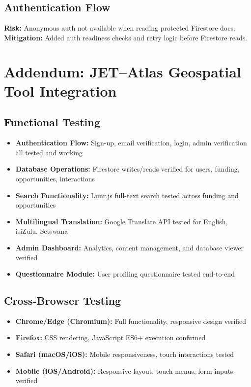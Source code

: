 \documentclass[a4paper,12pt]{article}
\begin{document}
\subsection{Authentication Flow}
\textbf{Risk:} Anonymous auth not available when reading protected Firestore docs.
\textbf{Mitigation:} Added auth readiness checks and retry logic before Firestore reads.

\section{Addendum: JET–Atlas Geospatial Tool Integration}


\subsection{Functional Testing}
\begin{itemize}
    \item \textbf{Authentication Flow:} Sign-up, email verification, login, admin verification all tested and working
    \item \textbf{Database Operations:} Firestore writes/reads verified for users, funding, opportunities, interactions
    \item \textbf{Search Functionality:} Lunr.js full-text search tested across funding and opportunities
    \item \textbf{Multilingual Translation:} Google Translate API tested for English, isiZulu, Setswana
    \item \textbf{Admin Dashboard:} Analytics, content management, and database viewer verified
    \item \textbf{Questionnaire Module:} User profiling questionnaire tested end-to-end
\end{itemize}

\subsection{Cross-Browser Testing}
\begin{itemize}
    \item \textbf{Chrome/Edge (Chromium):} Full functionality, responsive design verified
    \item \textbf{Firefox:} CSS rendering, JavaScript ES6+ execution confirmed
    \item \textbf{Safari (macOS/iOS):} Mobile responsiveness, touch interactions tested
    \item \textbf{Mobile (iOS/Android):} Responsive layout, touch menus, form inputs verified
\end{itemize}
\end{document}
